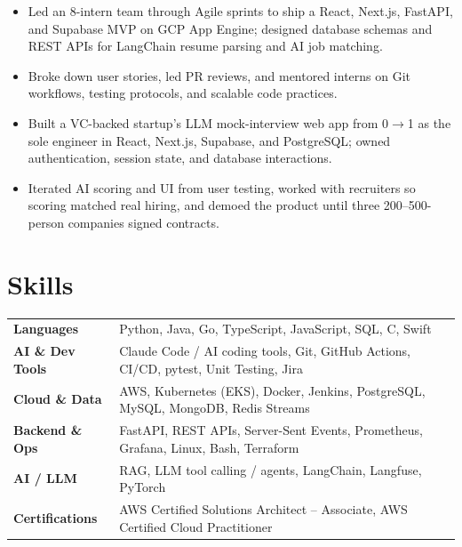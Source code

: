 \documentclass[11pt, letterpaper]{article}
\begin{document}
\begin{itemize}
  \item Led an 8-intern team through Agile sprints to ship a React, Next.js, FastAPI, and Supabase MVP on GCP App Engine; designed database schemas and REST APIs for LangChain resume parsing and AI job matching.
  \item Broke down user stories, led PR reviews, and mentored interns on Git workflows, testing protocols, and scalable code practices.
\end{itemize}

\begin{itemize}
  \item Built a VC-backed startup's LLM mock-interview web app from 0$\to$1 as the sole engineer in React, Next.js, Supabase, and PostgreSQL; owned authentication, session state, and database interactions.
  \item Iterated AI scoring and UI from user testing, worked with recruiters so scoring matched real hiring, and demoed the product until three 200--500-person companies signed contracts.
\end{itemize}

\section{Skills}
\begin{tabularx}{\textwidth}{@{}l @{\hspace{7pt}} >{\raggedright\arraybackslash}X@{}}
  \textbf{Languages} & Python, Java, Go, TypeScript, JavaScript, SQL, C, Swift \\[1pt]
  \textbf{AI \& Dev Tools} & Claude Code / AI coding tools, Git, GitHub Actions, CI/CD, pytest, Unit Testing, Jira \\[1pt]
  \textbf{Cloud \& Data} & AWS, Kubernetes (EKS), Docker, Jenkins, PostgreSQL, MySQL, MongoDB, Redis Streams \\[1pt]
  \textbf{Backend \& Ops} & FastAPI, REST APIs, Server-Sent Events, Prometheus, Grafana, Linux, Bash, Terraform \\[1pt]
  \textbf{AI / LLM} & RAG, LLM tool calling / agents, LangChain, Langfuse, PyTorch \\[1pt]
  \textbf{Certifications} & AWS Certified Solutions Architect -- Associate, AWS Certified Cloud Practitioner \\
\end{tabularx}
\end{document}
